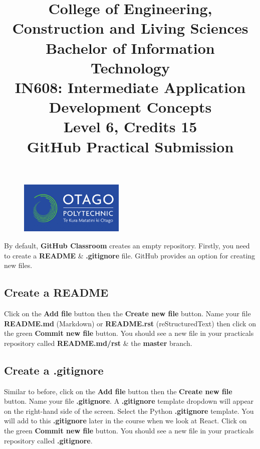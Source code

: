 \documentclass{article}
\author{}
\begin{document}
\begin{figure}
	\centering
	\includegraphics[width=50mm]{./img/logo.png}
\end{figure}

\title{College of Engineering, Construction and Living Sciences\\Bachelor of Information Technology\\IN608: Intermediate Application Development Concepts\\Level 6, Credits 15\\\textbf{GitHub Practical Submission}} 
\date{}
\maketitle

By default, \textbf{GitHub Classroom} creates an empty repository. Firstly, you need to create a \textbf{README} \& \textbf{.gitignore} file. GitHub provides an option for creating new files. 

\subsection*{Create a README} 

Click on the \textbf{Add file} button then the \textbf{Create new file} button. Name your file \textbf{README.md} (Markdown) or \textbf{README.rst} (reStructuredText) then click on the green \textbf{Commit new file} button. You should see a new file in your practicals repository called \textbf{README.md/rst} \& the \textbf{master} branch. 

\subsection*{Create a .gitignore} 

Similar to before, click on the \textbf{Add file} button then the \textbf{Create new file} button. Name your file \textbf{.gitignore}. A \textbf{.gitignore} template dropdown will appear on the right-hand side of the screen. Select the Python \textbf{.gitignore} template. You will add to this \textbf{.gitignore} later in the course when we look at React. Click on the green \textbf{Commit new file} button. You should see a new file in your practicals repository called \textbf{.gitignore}. \\ 
\end{document}
